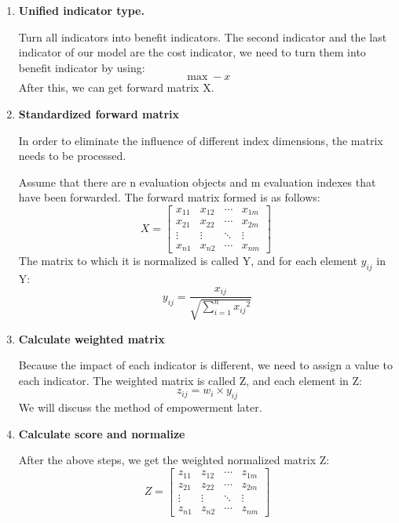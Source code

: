 \documentclass[12pt]{article}  %
\begin{document}
\begin{enumerate}[\bfseries 1.]
	\item \textbf{Unified indicator type.}
	
	Turn all indicators into benefit indicators. The second indicator and the last indicator of our model are the cost indicator, we need to turn them into benefit indicator by using:
	\begin{equation}
		\max  - x
	\end{equation}
	After this, we can get forward matrix X.
	
	\item \textbf{Standardized forward matrix}
	
	In order to eliminate the influence of different index dimensions, the matrix needs to be processed.
	
	Assume that there are n evaluation objects and m evaluation indexes that have been forwarded. The forward matrix formed is as follows:
	\begin{equation}
		X = \left[ {\begin{array}{*{20}{c}}
				{{x_{11}}}&{{x_{12}}}& \cdots &{{x_{1m}}}\\
				{{x_{21}}}&{{x_{22}}}& \cdots &{{x_{2m}}}\\
				\vdots & \vdots & \ddots & \vdots \\
				{{x_{n1}}}&{{x_{n2}}}& \cdots &{{x_{nm}}}
		\end{array}} \right]\
	\end{equation}
	The matrix to which it is normalized is called Y, and for each element ${y_{ij}}$ in Y:
	\begin{equation}
		{y_{ij}} = \frac{{{x_{ij}}}}{{\sqrt {\sum\limits_{i = 1}^n {{x_{ij}}^2} } }}
	\end{equation}
	
	\item \textbf{Calculate weighted matrix}
	
	Because the impact of each indicator is different, we need to assign a value to each indicator. The weighted matrix is called Z, and each element in Z:
	\begin{equation}
		{z_{ij}} = {w_i} \times {y_{ij}}
	\end{equation}
	We will discuss the method of empowerment later.
	
	\item \textbf{Calculate score and normalize}
	
	After the above steps, we get the weighted normalized matrix Z:
	\begin{equation}
		Z = \left[ {\begin{array}{*{20}{c}}
				{{z_{11}}}&{{z_{12}}}& \cdots &{{z_{1m}}}\\
				{{z_{21}}}&{{z_{22}}}& \cdots &{{z_{2m}}}\\
				\vdots & \vdots & \ddots & \vdots \\
				{{z_{n1}}}&{{z_{n2}}}& \cdots &{{z_{nm}}}
		\end{array}} \right]
	\end{equation}
	

\end{enumerate}
\end{document}

